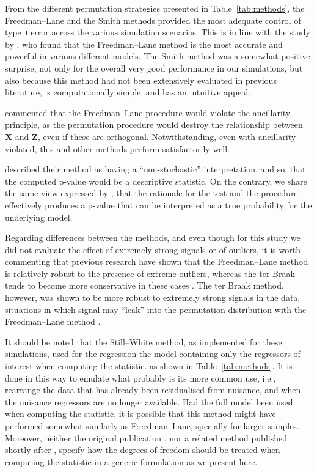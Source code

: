 From the different permutation strategies presented in Table~\ref{tab:methods}, the Freedman--Lane and the Smith methods provided the most adequate control of type~\textsc{i} error across the various simulation scenarios. This is in line with the study by \citet{Anderson1999}, who found that the Freedman--Lane method is the most accurate and powerful in various different models. The Smith method was a somewhat positive surprise, not only for the overall very good performance in our simulations, but also because this method had not been extensively evaluated in previous literature, is computationally simple, and has an intuitive appeal.

\citet{Welch1990} commented that the Freedman--Lane procedure would violate the ancillarity principle, as the permutation procedure would destroy the relationship between $\mathbf{X}$ and $\mathbf{Z}$, even if these are orthogonal. Notwithstanding, even with ancillarity violated, this and other methods perform satisfactorily well.

\citet{Freedman1983} described their method as having a ``non-stochastic'' interpretation, and so, that the computed p-value would be a descriptive statistic. On the contrary, we share the same view expressed by \citet{Anderson1999}, that the rationale for the test and the procedure effectively produces a p-value that can be interpreted as a true probability for the underlying model.

Regarding differences between the methods, and even though for this study we did not evaluate the effect of extremely strong signals or of outliers, it is worth commenting that previous research have shown that the Freedman--Lane method is relatively robust to the presence of extreme outliers, whereas the ter Braak tends to become more conservative in these cases \citep{Anderson1999}. The ter Braak method, however, was shown to be more robust to extremely strong signals in the data, situations in which signal may ``leak'' into the permutation distribution with the Freedman--Lane method \citep{Salimi-Khorshidi2011}.

It should be noted that the Still--White method, as implemented for these simulations, used for the regression the model containing only the regressors of interest when computing the statistic. as shown in Table~\ref{tab:methods}. It is done in this way to emulate what probably is its more common use, i.e., rearrange the data that has already been residualised from nuisance, and when the nuisance regressors are no longer available. Had the full model been used when computing the statistic, it is possible that this method might have performed somewhat similarly as Freedman--Lane, specially for larger samples. Moreover, neither the original publication \citep{Still1981}, nor a related method published shortly after \citep{Levin1983}, specify how the degrees of freedom should be treated when computing the statistic in a generic formulation as we present here.


